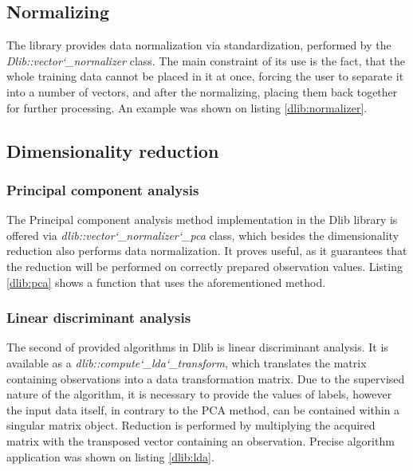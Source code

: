 \subsection{Normalizing}

The library provides data normalization via standardization, performed by the \textit{Dlib::vector\char`_normalizer} class. The main constraint of its use is the fact, that the whole training data cannot be placed in it at once, forcing the user to separate it into a number of vectors, and after the normalizing, placing them back together for further processing. An example was shown on listing \ref{dlib:normalizer}. 


\subsection{Dimensionality reduction}

\subsubsection{Principal component analysis}

The Principal component analysis method implementation in the Dlib library is offered via \textit{dlib::vector\char`_normalizer\char`_pca} class, which besides the dimensionality reduction also performs data normalization. It proves useful, as it guarantees that the reduction will be performed on correctly prepared observation values. Listing \ref{dlib:pca} shows a function that uses the aforementioned method.


\subsubsection{Linear discriminant analysis}

The second of provided algorithms in Dlib is linear discriminant analysis. It is available as a \textit{dlib::compute\char`_lda\char`_transform}, which translates the matrix containing observations into a data transformation matrix. Due to the supervised nature of the algorithm, it is necessary to provide the values of labels, however the input data itself, in contrary to the PCA method, can be contained within a singular matrix object. Reduction is performed by multiplying the acquired matrix with the transposed vector containing an observation. Precise algorithm application was shown on listing \ref{dlib:lda}.


